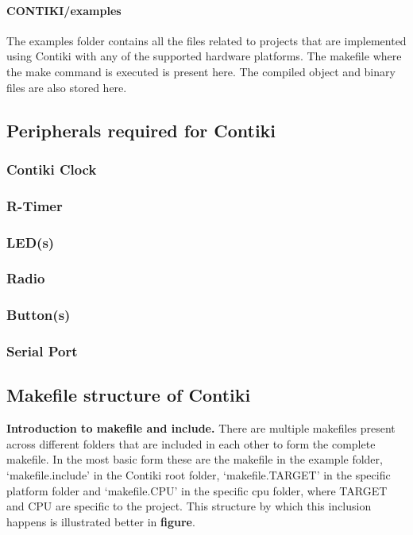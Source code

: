 \paragraph{CONTIKI/examples} The examples folder contains all the files related to projects that are implemented using Contiki with any of the supported hardware platforms. The makefile where the make command is executed is present here. The compiled object and binary files are also stored here.

\subsection{Peripherals required for Contiki}\label{peripheralsContiki}
\subsubsection{Contiki Clock}
\subsubsection{R-Timer}
\subsubsection{LED(s)}
\subsubsection{Radio}
\subsubsection{Button(s)}
\subsubsection{Serial Port}

\subsection{Makefile structure of Contiki}

\textbf{Introduction to makefile and include.}
There are multiple makefiles present across different folders that are included in each other to form the complete makefile. In the most basic form these are the makefile in the example folder, `makefile.include' in the Contiki root folder, `makefile.TARGET' in the specific platform folder and `makefile.CPU' in the specific cpu folder, where TARGET and CPU are specific to the project. This structure by which this inclusion happens is illustrated better in \textbf{figure}.

